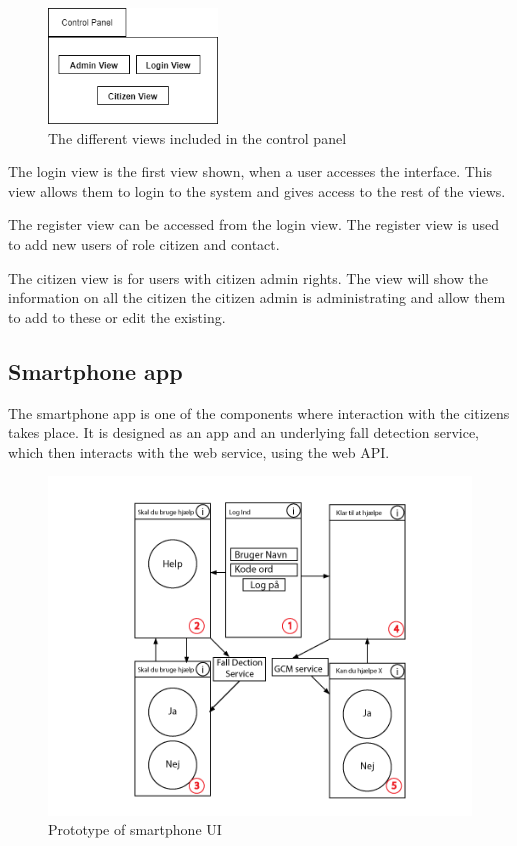 \begin{figure}[H]
    \centering
    \includegraphics[width=0.4\textwidth]{Figures/ControlPanel.png}
    \caption{The different views included in the control panel}
    \label{fig:controlpanel}
\end{figure}

The login view is the first view shown, when a user accesses the interface. This view allows them to login to the system and gives access to the rest of the views.

The register view can be accessed from the login view. The register view is used to add new users of role citizen and contact.

The citizen view is for users with citizen admin rights. The view will show the information on all the citizen the citizen admin is administrating and allow them to add to these or edit the existing.

\subsection{Smartphone app}
The smartphone app is one of the components where interaction with the citizens takes place. It is designed as an app and an underlying fall detection service, which then interacts with the web service, using the web API.

\begin{figure}[H]
    \centering
    \includegraphics[width=1.0\textwidth]{Figures/MobilUI.png}
    \caption{Prototype of smartphone UI}
    \label{fig:mobilUI}
\end{figure}

